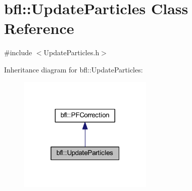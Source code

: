 \hypertarget{classbfl_1_1UpdateParticles}{}\section{bfl\+:\+:Update\+Particles Class Reference}
\label{classbfl_1_1UpdateParticles}


{\ttfamily \#include $<$Update\+Particles.\+h$>$}



Inheritance diagram for bfl\+:\+:Update\+Particles\+:
\nopagebreak
\begin{figure}[H]
\begin{center}
\leavevmode
\includegraphics[width=181pt]{classbfl_1_1UpdateParticles__inherit__graph}
\end{center}
\end{figure}
